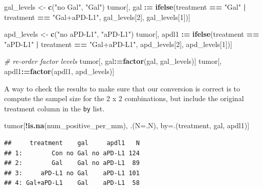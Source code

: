 \documentclass[]{book}
\newenvironment{Shaded}{\begin{snugshade}}{\end{snugshade}}
\newcommand{\CommentTok}[1]{\textcolor[rgb]{0.56,0.35,0.01}{\textit{#1}}}
\newcommand{\DataTypeTok}[1]{\textcolor[rgb]{0.13,0.29,0.53}{#1}}
\newcommand{\DecValTok}[1]{\textcolor[rgb]{0.00,0.00,0.81}{#1}}
\newcommand{\ErrorTok}[1]{\textcolor[rgb]{0.64,0.00,0.00}{\textbf{#1}}}
\newcommand{\KeywordTok}[1]{\textcolor[rgb]{0.13,0.29,0.53}{\textbf{#1}}}
\newcommand{\NormalTok}[1]{#1}
\newcommand{\OperatorTok}[1]{\textcolor[rgb]{0.81,0.36,0.00}{\textbf{#1}}}
\newcommand{\StringTok}[1]{\textcolor[rgb]{0.31,0.60,0.02}{#1}}
\begin{document}
\begin{Shaded}
\begin{Highlighting}[]
\NormalTok{gal_levels <-}\StringTok{ }\KeywordTok{c}\NormalTok{(}\StringTok{"no Gal"}\NormalTok{, }\StringTok{"Gal"}\NormalTok{)}
\NormalTok{tumor[, gal }\OperatorTok{:}\ErrorTok{=}\StringTok{ }\KeywordTok{ifelse}\NormalTok{(treatment }\OperatorTok{==}\StringTok{ "Gal"} \OperatorTok{|}\StringTok{ }\NormalTok{treatment }\OperatorTok{==}\StringTok{ "Gal+aPD-L1"}\NormalTok{,}
\NormalTok{                      gal_levels[}\DecValTok{2}\NormalTok{],}
\NormalTok{                      gal_levels[}\DecValTok{1}\NormalTok{])]}

\NormalTok{apd_levels <-}\StringTok{ }\KeywordTok{c}\NormalTok{(}\StringTok{"no aPD-L1"}\NormalTok{, }\StringTok{"aPD-L1"}\NormalTok{)}
\NormalTok{tumor[, apdl1 }\OperatorTok{:}\ErrorTok{=}\StringTok{ }\KeywordTok{ifelse}\NormalTok{(treatment }\OperatorTok{==}\StringTok{ "aPD-L1"} \OperatorTok{|}\StringTok{ }\NormalTok{treatment }\OperatorTok{==}\StringTok{ "Gal+aPD-L1"}\NormalTok{,}
\NormalTok{                      apd_levels[}\DecValTok{2}\NormalTok{],}
\NormalTok{                      apd_levels[}\DecValTok{1}\NormalTok{])]}

\CommentTok{# re-order factor levels}
\NormalTok{tumor[, gal}\OperatorTok{:}\ErrorTok{=}\KeywordTok{factor}\NormalTok{(gal, gal_levels)]}
\NormalTok{tumor[, apdl1}\OperatorTok{:}\ErrorTok{=}\KeywordTok{factor}\NormalTok{(apdl1, apd_levels)]}
\end{Highlighting}
\end{Shaded}

A way to check the results to make sure that our conversion is correct is to compute the sampel size for the 2 x 2 combinations, but include the original treatment column in the \texttt{by} list.

\begin{Shaded}
\begin{Highlighting}[]
\NormalTok{tumor[}\OperatorTok{!}\KeywordTok{is.na}\NormalTok{(num_positive_per_mm), .(}\DataTypeTok{N=}\NormalTok{.N), by=.(treatment, gal, apdl1)]}
\end{Highlighting}
\end{Shaded}

\begin{verbatim}
##     treatment    gal     apdl1   N
## 1:        Con no Gal no aPD-L1 124
## 2:        Gal    Gal no aPD-L1  89
## 3:     aPD-L1 no Gal    aPD-L1 101
## 4: Gal+aPD-L1    Gal    aPD-L1  58
\end{verbatim}
\end{document}
